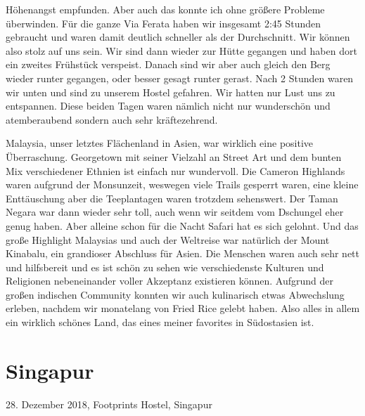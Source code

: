 \documentclass[11pt]{book}
\begin{document}
Höhenangst empfunden. Aber auch das konnte ich ohne größere Probleme überwinden. Für die ganze Via Ferata haben wir insgesamt 2:45 
Stunden gebraucht und waren damit deutlich schneller als der Durchschnitt. Wir können also stolz auf uns sein. Wir sind dann wieder 
zur Hütte gegangen und haben dort ein zweites Frühstück verspeist. Danach sind wir aber auch gleich den Berg wieder runter gegangen, 
oder besser gesagt runter gerast. Nach 2 Stunden waren wir unten und sind zu unserem Hostel gefahren. Wir hatten nur Lust uns zu entspannen.
Diese beiden Tagen waren nämlich nicht nur wunderschön und atemberaubend sondern auch sehr kräftezehrend.


Malaysia, unser letztes Flächenland in Asien, war wirklich eine positive Überraschung. Georgetown mit seiner Vielzahl an Street Art 
und dem bunten Mix verschiedener Ethnien ist einfach nur wundervoll. Die Cameron Highlands waren aufgrund der Monsunzeit, weswegen viele 
Trails gesperrt waren, eine kleine Enttäuschung aber die Teeplantagen waren trotzdem sehenswert. Der Taman Negara war dann wieder 
sehr toll, auch wenn wir seitdem vom Dschungel eher genug haben. Aber alleine schon für die Nacht Safari hat es sich gelohnt. Und das 
große Highlight Malaysias und auch der Weltreise war natürlich der Mount Kinabalu, ein grandioser Abschluss für Asien. Die Menschen 
waren auch sehr nett und hilfsbereit und es ist schön zu sehen wie verschiedenste Kulturen und Religionen nebeneinander voller Akzeptanz 
existieren können. Aufgrund der großen indischen Community konnten wir auch kulinarisch etwas Abwechslung erleben, nachdem wir monatelang 
von Fried Rice gelebt haben. Also alles in allem ein wirklich schönes Land, das eines meiner favorites in Südostasien ist.


\chapter{Singapur}

28. Dezember 2018, Footprints Hostel, Singapur
\end{document}
